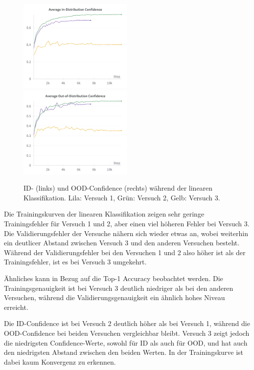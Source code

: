\begin{figure}[]
	\centering
	\includegraphics[width=0.5\textwidth]{figure_results_supcon-lin_avg-id-conf.png}%
	\includegraphics[width=0.5\textwidth]{figure_results_supcon-lin_avg-ood-conf.png}
	\caption{ID- (links) und OOD-Confidence (rechts) während der linearen Klassifikation. \textcolor{exp1}{Lila}: Versuch 1, \textcolor{exp2}{Grün}: Versuch 2, \textcolor{exp3}{Gelb}: Versuch 3.}
	\label{fig:supcon-lin-ood-detection}
\end{figure}

Die Trainingskurven der linearen Klassifikation zeigen sehr geringe Trainingsfehler für Versuch 1 und 2, aber einen viel höheren Fehler bei Versuch 3. Die Validierungsfehler der Versuche nähern sich wieder etwas an, wobei weiterhin ein deutlicer Abstand zwischen Versuch 3 und den anderen Versuchen besteht. Während der Validierungsfehler bei den Versuchen 1 und 2 also höher ist als der Trainingsfehler, ist es bei Versuch 3 umgekehrt.

Ähnliches kann in Bezug auf die Top-1 Accuracy beobachtet werden. Die Trainingsgenauigkeit ist bei Versuch 3 deutlich niedriger als bei den anderen Versuchen, während die Validierungsgenauigkeit ein ähnlich hohes Niveau erreicht.

Die ID-Confidence ist bei Versuch 2 deutlich höher als bei Versuch 1, während die OOD-Confidence bei beiden Versuchen vergleichbar bleibt. Versuch 3 zeigt jedoch die niedrigsten Confidence-Werte, sowohl für ID als auch für OOD, und hat auch den niedrigsten Abstand zwischen den beiden Werten. In der Trainingskurve ist dabei kaum Konvergenz zu erkennen.

